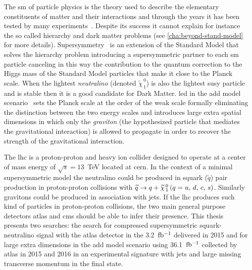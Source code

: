 The \gls{sm} of particle physics is the theory used to describe the elementary
constituents of matter and their interactions and through the years it has been
tested by many experiments~\cite{SMTests}. Despite its success it cannot explain
for instance the so called hierarchy and dark matter problems (see
\cref{cha:beyond-stand-model} for more details). Supersymmetry~\cite{SUSYIntro}
is an extension of the Standard Model that solves the hierarchy problem
introducing a supersymmetric partner to each \gls{sm} particle canceling in this
way the contribution to the quantum correction to the Higgs mass of the Standard
Model particles that make it close to the Planck scale. When the lightest
\emph{neutralino} (denoted $\widetilde{\chi}_{\, 1}^{\, 0}$) is also the
lightest \gls{susy} particle and is stable then it is a good candidate for Dark
Matter. \gls{led} in the \gls{add} model scenario~\cite{ADDPaper} sets the
Planck scale at the order of the weak scale formally eliminating the distinction
between the two energy scales and introduces large extra spatial dimensions in
which only the \emph{graviton} (the hypothesized particle that mediates the
gravitational interaction) is allowed to propagate in order to recover the
strength of the gravitational interaction.

The \gls{lhc} is a proton-proton and heavy ion collider designed to operate at a
center of mass energy of $\sqrt{s} = 13$~TeV located at \gls{cern}. In the
context of a minimal supersymmetric model the neutralino could be produced in
squark ($\tilde{q}$) pair production in proton-proton collisions with
$\widetilde{q} \rightarrow q + \widetilde{\chi}_{\, 1}^{\, 0}\, (q = u,\, d,\, c,\, s)$. Similarly gravitons could be produced in association with jets.
If the \gls{lhc} produces such kind of particles in proton-proton collisions,
the two main general purpose detectors \gls{atlas} and \gls{cms} should be able
to infer their presence. This thesis presents two searches: the search for
compressed supersymmetric squark-neutralino signal with the \gls{atlas} detector
in the 3.2~$\mbox{fb$^{-1}$}$ delivered in 2015 and for large extra dimensions in the
\gls{add} model scenario using 36.1~$\mbox{fb$^{-1}$}$ collected by \gls{atlas} in 2015 and
2016 in an experimental signature with jets and large missing transverse
momentum in the final state.

